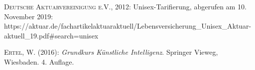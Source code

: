 \documentclass[a4paper,titlepage]{article}
\numberwithin{equation}{section} %
\begin{document}
\newpage


\begingroup
{}
\renewcommand*\refname{Bibliography}

\begin{thebibliography}{----}

\textsc{Deutsche Aktuarvereinigung e.V.}, 2012: Unisex-Tarifierung, abgerufen am 10. November 2019: https://aktuar.de/fachartikelaktuaraktuell/Lebensversicherung{\_}Unisex{\_}Aktuar-aktuell{\_}19.pdf{\#}search=unisex

\textsc{Ertel}, W. (2016): {\it Grundkurs Künstliche Intelligenz}. Springer Vieweg, Wiesbaden. 4. Auflage.


\end{thebibliography}
\endgroup


\newpage
\end{document}
